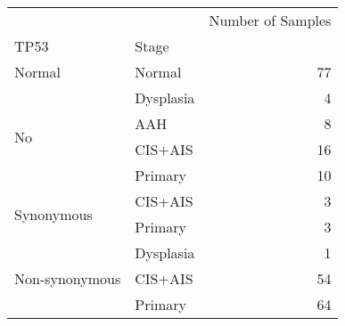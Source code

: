\begin{tabular}{l|lr}
\toprule
               &         & Number of Samples \\
TP53 & Stage &                   \\
\midrule
Normal & Normal &                77 \\
\multirow{4}{*}{No} & Dysplasia &                 4 \\
               & AAH &                 8 \\
               & CIS+AIS &                16 \\
               & Primary &                10 \\
\cline{1-3}
\multirow{2}{*}{Synonymous} & CIS+AIS &                 3 \\
               & Primary &                 3 \\
\cline{1-3}
\multirow{3}{*}{Non-synonymous} & Dysplasia &                 1 \\
               & CIS+AIS &                54 \\
               & Primary &                64 \\
\bottomrule
\end{tabular}
